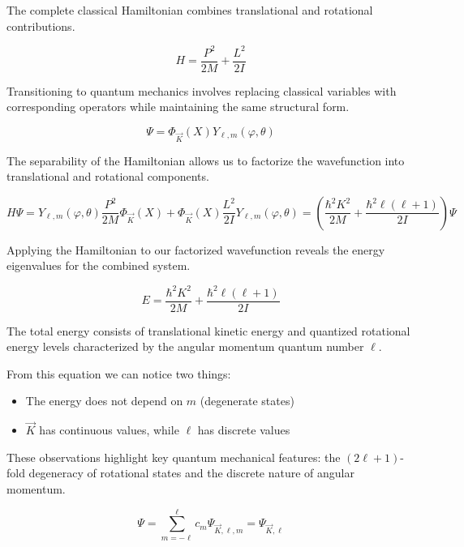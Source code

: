 \documentclass[italian]{HKNdocument}
\begin{document}
The complete classical Hamiltonian combines translational and rotational contributions.

\begin{equation}
H=\frac{P^{2}}{2 M}+\frac{L^{2}}{2 I} \label{eq:8.75}
\end{equation}

Transitioning to quantum mechanics involves replacing classical variables with corresponding operators while maintaining the same structural form.

\begin{equation}
\Psi=\Phi_{\vec{K}}(X) Y_{\ell, m}(\varphi, \theta) \label{eq:8.76}
\end{equation}

The separability of the Hamiltonian allows us to factorize the wavefunction into translational and rotational components.

\begin{equation}
H \Psi=Y_{\ell, m}(\varphi, \theta) \frac{P^{2}}{2 M} \Phi_{\vec{K}}(X)+\Phi_{\vec{K}}(X) \frac{L^{2}}{2 I} Y_{\ell, m}(\varphi, \theta)=\left(\frac{\hbar^{2} K^{2}}{2 M}+\frac{\hbar^{2} \ell(\ell+1)}{2 I}\right) \Psi \label{eq:8.77}
\end{equation}

Applying the Hamiltonian to our factorized wavefunction reveals the energy eigenvalues for the combined system.

\begin{equation}
E=\frac{\hbar^{2} K^{2}}{2 M}+\frac{\hbar^{2} \ell(\ell+1)}{2 I} \label{eq:8.78}
\end{equation}

The total energy consists of translational kinetic energy and quantized rotational energy levels characterized by the angular momentum quantum number $\ell$.

From this equation we can notice two things:

\begin{itemize}
  \item The energy does not depend on $m$ (degenerate states)
  \item $\vec{K}$ has continuous values, while $\ell$ has discrete values
\end{itemize}

These observations highlight key quantum mechanical features: the $(2\ell+1)$-fold degeneracy of rotational states and the discrete nature of angular momentum.

\begin{equation}
\Psi=\sum_{m=-\ell}^{\ell} c_{m} \Psi_{\vec{K}, \ell, m}=\Psi_{\vec{K}, \ell} \label{eq:8.79}
\end{equation}
\end{document}

